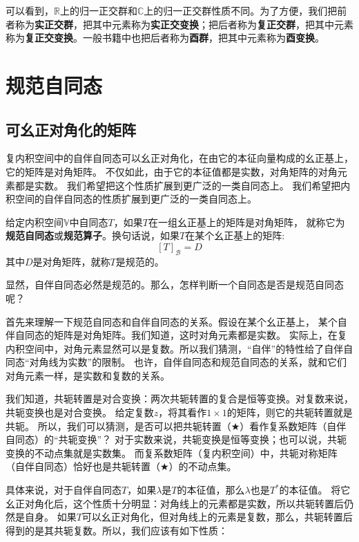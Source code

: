 \documentclass[12pt,UTF8]{ctexbook}
\begin{document}
可以看到，$\mathbb{R}$上的归一正交群和$\mathbb{C}$上的归一正交群性质不同。为了方便，我们把前者称为\textbf{实正交群}，把其中元素称为\textbf{实正交变换}；把后者称为\textbf{复正交群}，把其中元素称为\textbf{复正交变换}。一般书籍中也把后者称为\textbf{酉群}，把其中元素称为\textbf{酉变换}。

\section{规范自同态}
\subsection{可幺正对角化的矩阵}
复内积空间中的自伴自同态可以幺正对角化，在由它的本征向量构成的幺正基上，它的矩阵是对角矩阵。
不仅如此，由于它的本征值都是实数，对角矩阵的对角元素都是实数。
我们希望把这个性质扩展到更广泛的一类自同态上。
我们希望把内积空间的自伴自同态的性质扩展到更广泛的一类自同态上。
\begin{df}\label{df:8_3}
    给定内积空间$\mathbb{V}$中自同态$T$，如果$T$在一组幺正基上的矩阵是对角矩阵，
    就称它为\textbf{规范自同态}或\textbf{规范算子}。换句话说，如果$T$在某个幺正基上的矩阵:
    $$ [T]_{\mathcal{B}} = D $$
    其中$D$是对角矩阵，就称$T$是规范的。
\end{df}
显然，自伴自同态必然是规范的。那么，怎样判断一个自同态是否是规范自同态呢？

首先来理解一下规范自同态和自伴自同态的关系。假设在某个幺正基上，
某个自伴自同态的矩阵是对角矩阵。我们知道，这时对角元素都是实数。
实际上，在复内积空间中，对角元素显然可以是复数。所以我们猜测，“自伴”的特性给了自伴自同态“对角线为实数”的限制。
也许，自伴自同态和规范自同态的关系，就和它们对角元素一样，是实数和复数的关系。

我们知道，共轭转置是对合变换：两次共轭转置的复合是恒等变换。对复数来说，共轭变换也是对合变换。
给定复数$z$，将其看作$1\times 1$的矩阵，则它的共轭转置就是共轭。
所以，我们可以猜测，是否可以把共轭转置（$\bigstar$）看作复系数矩阵（自伴自同态）的“共轭变换”？
对于实数来说，共轭变换是恒等变换；也可以说，共轭变换的不动点集就是实数集。
而复系数矩阵（复内积空间）中，共轭对称矩阵（自伴自同态）恰好也是共轭转置（$\bigstar$）的不动点集。

具体来说，对于自伴自同态$T$，如果$\lambda$是$T$的本征值，那么$\lambda$也是$T^*$的本征值。
将它幺正对角化后，这个性质十分明显：对角线上的元素都是实数，所以共轭转置后仍然是自身。
如果$T$可以幺正对角化，但对角线上的元素是复数，那么，共轭转置后得到的是其共轭复数。所以，我们应该有如下性质：
\end{document}
